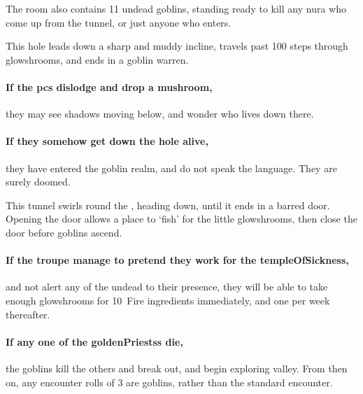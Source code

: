 \begin{multicols}{2}
The room also contains 11 undead goblins, standing ready to kill any nura who come up from the tunnel, or just anyone who enters.

\undeadgoblin

\undeadhobgoblin


This hole leads down a sharp and muddy incline, travels past 100 \glspl{step} through glowshrooms, and ends in a goblin warren.

\paragraph{If the \glspl{pc} dislodge and drop a mushroom,}
they may see shadows moving below, and wonder who lives down there.

\paragraph{If they somehow get down the hole alive,}
they have entered the goblin realm, and do not speak the language.
They are surely doomed.


\begin{exampletext}
  This tunnel swirls round the , heading down, until it ends in a barred door.
  Opening the door allows a place to `fish' for the little glowshrooms, then close the door before goblins ascend.
\end{exampletext}


\bigLine

\paragraph{If the troupe manage to pretend they work for the \gls{templeOfSickness},}
and not alert any of the undead to their presence, they will be able to take enough glowshrooms for 10~Fire \glspl{ingredient} immediately, and one per week thereafter.

\paragraph{If any one of the \glspl{goldenPriests} die,}
the goblins kill the others and break out, and begin exploring \gls{valley}.
From then on, any encounter rolls of 3 are goblins, rather than the standard encounter.%

\end{multicols}
